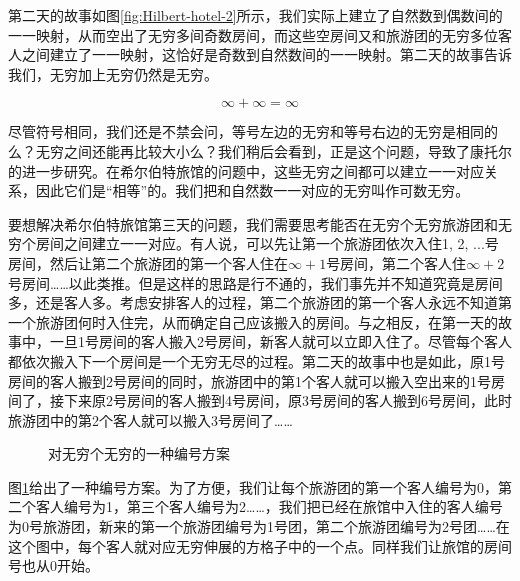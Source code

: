 \documentclass{article}
\begin{document}
第二天的故事如图\ref{fig:Hilbert-hotel-2}所示，我们实际上建立了自然数到偶数间的一一映射，从而空出了无穷多间奇数房间，而这些空房间又和旅游团的无穷多位客人之间建立了一一映射，这恰好是奇数到自然数间的一一映射。第二天的故事告诉我们，无穷加上无穷仍然是无穷。

\[
\infty + \infty = \infty
\]

尽管符号相同，我们还是不禁会问，等号左边的无穷和等号右边的无穷是相同的么？无穷之间还能再比较大小么？我们稍后会看到，正是这个问题，导致了康托尔的进一步研究。在希尔伯特旅馆的问题中，这些无穷之间都可以建立一一对应关系，因此它们是“相等”的。我们把和自然数一一对应的无穷叫作可数无穷。

要想解决希尔伯特旅馆第三天的问题，我们需要思考能否在无穷个无穷旅游团和无穷个房间之间建立一一对应。有人说，可以先让第一个旅游团依次入住1, 2, ...号房间，然后让第二个旅游团的第一个客人住在$\infty + 1$号房间，第二个客人住$\infty + 2$号房间……以此类推。但是这样的思路是行不通的，我们事先并不知道究竟是房间多，还是客人多。考虑安排客人的过程，第二个旅游团的第一个客人永远不知道第一个旅游团何时入住完，从而确定自己应该搬入的房间。与之相反，在第一天的故事中，一旦1号房间的客人搬入2号房间，新客人就可以立即入住了。尽管每个客人都依次搬入下一个房间是一个无穷无尽的过程。第二天的故事中也是如此，原1号房间的客人搬到2号房间的同时，旅游团中的第1个客人就可以搬入空出来的1号房间了，接下来原2号房间的客人搬到4号房间，原3号房间的客人搬到6号房间，此时旅游团中的第2个客人就可以搬入3号房间了……

\begin{figure}[htbp]
\centering
{}
\caption{对无穷个无穷的一种编号方案}
\label{fig:NNtoN}
\end{figure}

图\ref{fig:NNtoN}给出了一种编号方案。为了方便，我们让每个旅游团的第一个客人编号为0，第二个客人编号为1，第三个客人编号为2……，我们把已经在旅馆中入住的客人编号为0号旅游团，新来的第一个旅游团编号为1号团，第二个旅游团编号为2号团……在这个图中，每个客人就对应无穷伸展的方格子中的一个点。同样我们让旅馆的房间号也从0开始。
\end{document}
